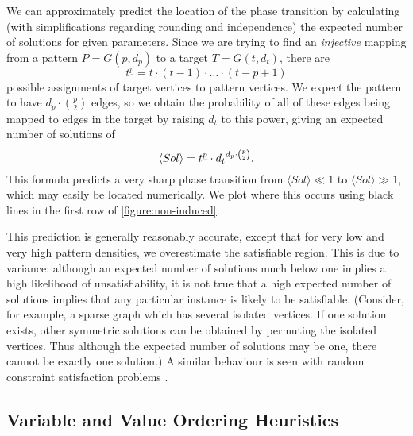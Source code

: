 \documentclass[twoside,11pt]{article}
\newcommand{\citep}[1]{\cite{#1}}
\begin{document}
We can approximately predict the location of the phase transition by calculating (with
simplifications regarding rounding and independence) the expected number of solutions for given
parameters. Since we are trying to find an \emph{injective} mapping from a pattern $P = G(p, d_p)$
to a target $T = G(t, d_t)$, there are \[ t^{\underline{p}} = t \cdot (t - 1) \cdot \ldots \cdot (t -
p + 1) \] possible assignments of target vertices to pattern vertices.  We expect the pattern to have
$d_p \cdot \binom{p}{2}$ edges, so we obtain the probability of all of these edges being mapped to
edges in the target by raising $d_t$ to this power, giving an expected number of solutions of
\begin{equation}
    \langle Sol \rangle = t^{\underline{p}} \cdot {d_t}^{d_p \cdot \binom{p}{2}} \textnormal{.}
\end{equation} This
formula predicts a very sharp phase transition from $\langle Sol \rangle \ll 1$ to $\langle Sol
\rangle \gg 1$, which may easily be located numerically. We plot where this occurs using black lines
in the first row of \cref{figure:non-induced}.

This prediction is generally reasonably accurate, except that for very low and very high pattern
densities, we overestimate the satisfiable region. This is due to variance: although an expected
number of solutions much below one implies a high likelihood of unsatisfiability, it is not true
that a high expected number of solutions implies that any particular instance is likely to be
satisfiable. (Consider, for example, a sparse graph which has several isolated vertices. If one
solution exists, other symmetric solutions can be obtained by permuting the isolated vertices.
Thus although the expected number of solutions may be one, there cannot be exactly one solution.) A
similar behaviour is seen with random constraint satisfaction problems
\citep{Smith:1996}.

\subsection{Variable and Value Ordering Heuristics}
\end{document}
